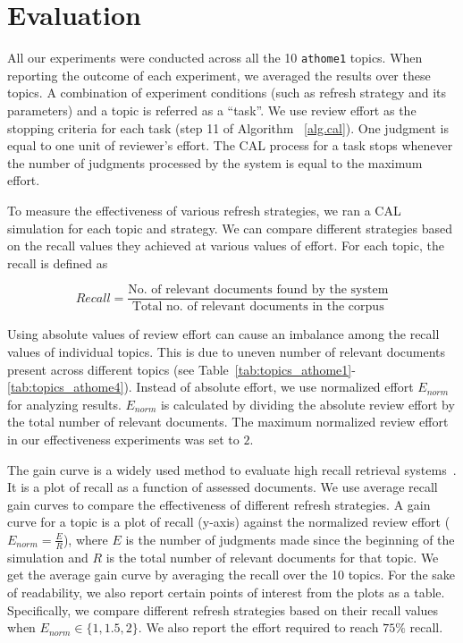 \section{Evaluation}
\label{sec:eval}

All our experiments were conducted across all the 10 \texttt{athome1} topics.
When reporting the outcome of each experiment, we averaged the results over
these topics. A combination of experiment conditions (such as refresh strategy
and its parameters) and a topic is referred as
a ``task''. We use review effort as the stopping criteria for each task (step 11
of Algorithm ~\ref{alg.cal}). One judgment is equal to one unit of reviewer's
effort. The CAL process for a task stops whenever the number of judgments
processed by the system is equal to the maximum effort.

To measure the effectiveness of various refresh strategies, we ran a CAL simulation for
each topic and strategy. We can compare different strategies based on the recall
values they achieved at various values of effort. For each topic, the recall is
defined as

\begin{equation}
    Recall = \frac{\text{No. of relevant documents found by the system}}{\text{Total no. of
    relevant documents in the corpus}}
\end{equation}

Using absolute values of review effort can cause an imbalance among the recall
values of individual topics. This is due to uneven number of relevant documents
present across different topics (see
Table~\ref{tab:topics_athome1}-\ref{tab:topics_athome4}). Instead of
absolute effort, we use normalized effort $E_{norm}$ for analyzing results.
$E_{norm}$ is calculated by dividing the absolute review effort by the total
number of relevant documents. The maximum normalized review effort in our
effectiveness experiments was set to $2$.

The gain curve is a widely used method to evaluate high recall retrieval
systems~\cite{roegiest2015trec,grossman2016trec,grossman2011overview}. It is a
plot of recall as a function of assessed documents. We use average recall gain
curves to compare the effectiveness of different refresh strategies.  A gain
curve for a topic is a plot of recall (y-axis) against the normalized review
effort ($E_{norm} = \frac{E}{R}$), where $E$ is the number of judgments made
since the beginning of the simulation and $R$ is the total number of relevant
documents for that topic. We get the average gain curve by averaging the recall
over the 10 topics. For the sake of readability, we also report certain points
of interest from the plots as a table. Specifically, we compare different
refresh strategies based on their recall values when $E_{norm} \in \{1,1.5,2\}$.
We also report the effort required to reach $75\%$ recall.

